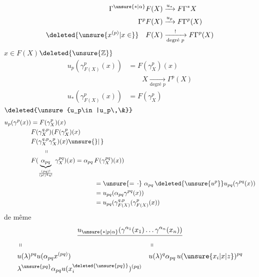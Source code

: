 \[
\begin{aligned}
\Gamma^{\unsure{*|\alpha}}F(X)&\xrightarrow{u_*}F\Gamma^*X\\
\Gamma^p F(X)&\xrightarrow{u_p}F\Gamma^p(X)\\
\deleted{\unsure{x^{(p)}|x\in}}\quad F(X)&\xrightarrow[\text{degré }p]{!}F\Gamma^p(X)
\end{aligned}
\]
$x\in F(X)$\qquad $\deleted{\unsure{\mathbb Z}}$
\[
\begin{aligned}
u_p(\gamma^p_{F(X)}(x))&=F(\gamma^p_X)(x)\\
&\qquad X\xrightarrow[\text{degré }p]{}\Gamma^p(X)\\
u_*(\gamma^p_{F(X)}(x))&=F(\gamma^p_X)
\end{aligned}
\]
$\deleted{\unsure{u_p\in|u_p\,\&}}$
\[
\begin{aligned}
u_p(\gamma^p(x))&=F(\gamma^p_X)(x)\\
&F(\gamma_X^{q,p})(F(\gamma^p_X)(x)\\
&F(\gamma_X^{q,p}\gamma^p_X)(x)\unsure{\}|\,}\\
&\hspace{2em}\shortparallel\\
&F(\underbrace{\alpha_{pq}}_{\frac{(pq)!}{(p!)^q q!}}\,\gamma_X^{pq})(x)=\alpha_{pq}\,F(\gamma_X^{pq})(x))\\
&\hspace{10em}=\unsure{=\,{\cdot}}\ \alpha_{pq}\,\deleted{\unsure{u^p}}u_{pq}(\gamma^{pq}(x))\\
&\hspace{10em}=u_{pq}(\alpha_{pq}\gamma^{pq}(x))\\
&\hspace{10em}=u_{pq}(\gamma^{q,p}_{F(X)}(\gamma^p_{F(X)}(x))
\end{aligned}
\]
de même 
\[
\underline{u_{\unsure{*|p|\alpha}}(\gamma^{\alpha_1}(x_1)\ldots\gamma^{\alpha_n}(x_n))}
\]
\[
\begin{aligned}
&\shortparallel &&\shortparallel\\
&u(\lambda)^{pq}u(\alpha_{pq}x^{(pq)})&&u(\lambda)^q\alpha_{pq}\,u(\unsure{x_i|x|z})^{pq}\\
&\lambda^{\unsure{pq}}\alpha_{pq}u(x_i^{\deleted{\unsure{pq}}})^{(pq)}
\end{aligned}
\]

